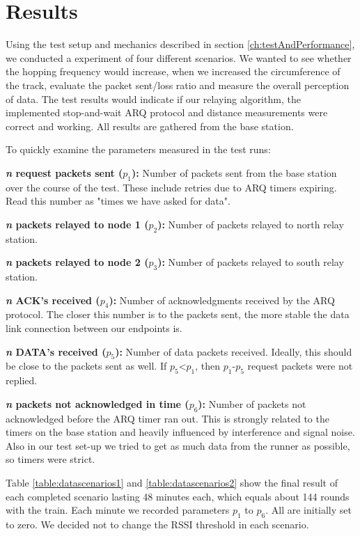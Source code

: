\section{Results}\label{ch:results}

Using the test setup and mechanics described in section \ref{ch:testAndPerformance}, we conducted a experiment of four different scenarios. We wanted to see whether the hopping frequency would increase, when we increased the circumference of the track, evaluate the packet sent/loss ratio and measure the overall perception of data. The test results would indicate if our relaying algorithm, the implemented stop-and-wait ARQ protocol and distance measurements were correct and working. All results are gathered from the base station.

\noindent To quickly examine the parameters measured in the test runs:

\noindent \textbf{\textit{n} request packets sent ($p_1$):} Number of packets sent from the base station over the course of the test. These include retries due to ARQ timers expiring. Read this number as "times we have asked for data".

\noindent \textbf{\textit{n} packets relayed to node 1 ($p_2$):} Number of packets relayed to north relay station.

\noindent \textbf{\textit{n} packets relayed to node 2 ($p_3$):} Number of packets relayed to south relay station.

\noindent \textbf{\textit{n} ACK's received ($p_4$):} Number of acknowledgments received by the ARQ protocol. The closer this number is to the packets sent, the more stable the data link connection between our endpoints is.

\noindent \textbf{\textit{n} DATA's received ($p_5$):} Number of data packets received. Ideally, this should be close to the packets sent as well. If $p_5$<$p_1$, then $p_1$-$p_5$ request packets were not replied.

\noindent \textbf{\textit{n} packets not acknowledged in time ($p_6$):} Number of packets not acknowledged before the ARQ timer ran out. This is strongly related to the timers on the base station and heavily influenced by interference and signal noise. Also in our test set-up we tried to get as much data from the runner as possible, so timers were strict.

\noindent Table \ref{table:datascenarios1} and \ref{table:datascenarios2} show the final result of each completed scenario lasting 48 minutes each, which equals about 144 rounds with the train. Each minute we recorded parameters $p_1$ to $p_6$. All are initially set to zero. We decided not to change the RSSI threshold in each scenario.

